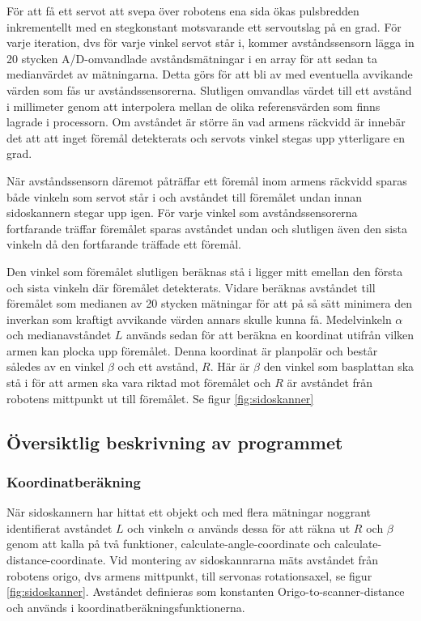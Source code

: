 För att få ett servot att svepa över robotens ena sida ökas pulsbredden inkrementellt med en stegkonstant motsvarande ett servoutslag på en grad. För varje iteration, dvs för varje vinkel servot står i, kommer avståndssensorn lägga in 20 stycken A/D-omvandlade avståndsmätningar i en array för att sedan ta medianvärdet av mätningarna. Detta görs för att bli av med eventuella avvikande värden som fås ur avståndssensorerna. Slutligen omvandlas värdet till ett avstånd i millimeter genom att interpolera mellan de olika referensvärden som finns lagrade i processorn. Om avståndet är större än vad armens räckvidd är innebär det att att inget föremål detekterats och servots vinkel stegas upp ytterligare en grad. 

När avståndssensorn däremot påträffar ett föremål inom armens räckvidd sparas både vinkeln som servot står i och avståndet till föremålet undan innan sidoskannern stegar upp igen. För varje vinkel som avståndssensorerna fortfarande träffar föremålet sparas avståndet undan och slutligen även den sista vinkeln då den fortfarande träffade ett föremål.

Den vinkel som föremålet slutligen beräknas stå i ligger mitt emellan den första och sista vinkeln där föremålet detekterats. Vidare beräknas avståndet till föremålet som medianen av 20 stycken mätningar för att på så sätt minimera den inverkan som kraftigt avvikande värden annars skulle kunna få. Medelvinkeln $\alpha$ och medianavståndet $L$ används sedan för att beräkna en koordinat utifrån vilken armen kan plocka upp föremålet. Denna koordinat är planpolär och består således av en vinkel $\beta$ och ett avstånd, $R$. Här är $\beta$ den vinkel som basplattan ska stå i för att armen ska vara riktad mot föremålet och $R$ är avståndet från robotens mittpunkt ut till föremålet. Se figur \ref{fig:sidoskanner}

\subsection{Översiktlig beskrivning av programmet}

\subsubsection{Koordinatberäkning}
När sidoskannern har hittat ett objekt och med flera mätningar noggrant identifierat avståndet $L$ och vinkeln $\alpha$ används dessa för att räkna ut $R$ och $\beta$ genom att kalla på två funktioner, calculate-angle-coordinate och calculate-distance-coordinate.
Vid montering av sidoskannrarna mäts avståndet från robotens origo, dvs armens mittpunkt, till servonas rotationsaxel, se figur \ref{fig:sidoskanner}. Avståndet definieras som konstanten Origo-to-scanner-distance och används i koordinatberäkningsfunktionerna.

